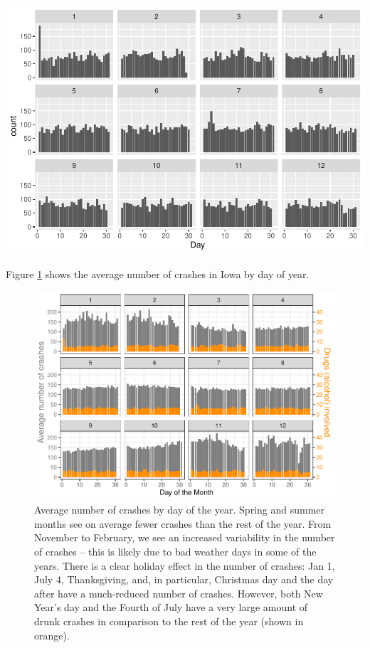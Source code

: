 \documentclass[conference,final,]{IEEEtran}
\begin{document}
\begin{center}\includegraphics[width=0.9\columnwidth]{CAUSE_files/figure-latex/unnamed-chunk-15-1} \end{center}

Figure \ref{fig:avgcrashes} shows the average number of crashes in Iowa by day of year.

\begin{figure}

{\centering \includegraphics[width=\columnwidth]{CAUSE_files/figure-latex/avgcrashes-1} 

}

\caption{Average number of crashes by day of the year. Spring and summer months see on average fewer crashes than the rest of the year. From November to February, we see an increased variability in the number of crashes -- this is likely due to bad weather days in some of the years. There is a clear holiday effect in the number of crashes: Jan 1, July 4, Thanksgiving, and, in particular, Christmas day and the day after have a much-reduced number of crashes. However, both New Year's day and the Fourth of July have a very large amount of drunk crashes in comparison to the rest of the year (shown in orange). }\label{fig:avgcrashes}
\end{figure}
\end{document}

